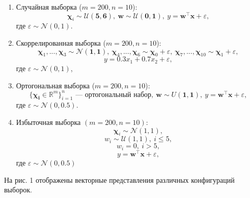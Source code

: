 \documentclass[12pt, a4paper]{scrartcl}
\theoremstyle{plain}
\theoremstyle{definition}
\begin{document}
\begin{enumerate}
	\item Случайная выборка ($m = 200, n = 10$): 
$$ 
\boldsymbol{\chi}_i \sim \mathcal{U}(\mathbf{5}, \mathbf{6}), ~ \mathbf{w} \sim \mathcal{U}(\mathbf{0}, \mathbf{1}), ~ y = \mathbf{w}^{\top}\mathbf{x} + \varepsilon,
$$
где $\varepsilon \sim \mathcal{N}(0, 1)$.
	\item Скоррелированная выборка ($m = 200, n = 10$):
$$
\boldsymbol{\chi}_1, ..., \boldsymbol{\chi}_3 \sim \mathcal{N}(\mathbf{1}, \mathbf{1}),~ \boldsymbol{\chi}_4, ..., \boldsymbol{\chi}_6 \sim \boldsymbol{\chi}_0 + \varepsilon, ~\boldsymbol{\chi}_7, ..., \boldsymbol{\chi}_{10} \sim \boldsymbol{\chi}_1 + \varepsilon,
$$
$$
	y = 0.3x_1 + 0.7x_2 + \varepsilon,
$$
где $\varepsilon \sim \mathcal{N}(0, 1)$,
	\item Ортогональная выборка ($m = 200, n = 10$):
$$
	\{\boldsymbol{\chi_i} \in \mathbb{R}^{m}\}_{i=1}^{n}  \text{ --- ортогональный набор}, ~\mathbf{w} \sim U(\mathbf{1}, \mathbf{1}), ~y = \mathbf{w}^{\top}\mathbf{x} + \varepsilon,
$$
где $\varepsilon \sim \mathcal{N}(0, 0.5)$.
	\item Избыточная выборка $(m=200, n=10)$:
$$
	\boldsymbol{\chi}_i \sim \mathcal{N}(1, 1), 
$$
$$
	w_i \sim \mathcal{U}(1, 1), ~i \leq 5, 
$$
$$
	w_i = 0, ~i > 5,
$$
$$
	y = \mathbf{w}^{\top}\mathbf{x} + \varepsilon,
$$
где $\varepsilon \sim \mathcal{N}(0, 0.5)$
\end{enumerate}

На рис. 1 отображены векторные представления различных конфигураций выборок.
\end{document}
